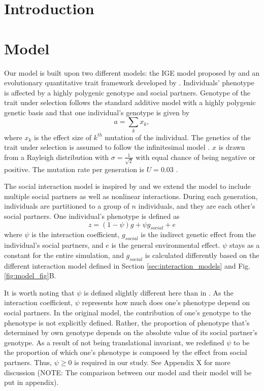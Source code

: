 \documentclass{article}
\begin{document}
\section{Introduction}



\section{Model}
Our model is built upon two different models: the IGE model proposed by \cite{Moore1997} and an evolutionary quantitative trait framework developed by \cite{Hayward2022}. Individuals' phenotype is affected by a highly polygenic genotype and social partners. Genotype of the trait under selection follows the standard additive model with a highly polygenic genetic basis \cite{Hayward2022, Falconer1996} and that one individual's genotype is given by 
\begin{equation}
a = \sum_k x_{k},
\label{g_def}
\end{equation}
where $x_k$ is the effect size of $k^{th}$ mutation of the individual. The genetics of the trait under selection is assumed to follow the infinitesimal model \cite{Fisher1918}. $x$ is drawn from a Rayleigh distribution with $\sigma=\frac{1}{\sqrt{2}}$ with equal chance of being negative or positive. The mutation rate per generation is $U=0.03$ \cite{Hayward2022}.

The social interaction model is inspired by \cite{Moore1997} and we extend the model to include multiple social partners as well as nonlinear interactions. During each generation, individuals are partitioned to a group of $n$ individuals, and they are each other's social partners. One individual's phenotype is defined as 
\begin{equation}
\label{eq:z_def}
z = (1-\psi)g+\psi g_{social} +e
\end{equation}
where $\psi$ is the interaction coefficient, $g_{social}$ is the indirect genetic effect from the individual's social partners, and $e$ is the general environmental effect. $\psi$ stays as a constant for the entire simulation, and $g_{social}$ is calculated differently based on the different interaction model defined in Section \ref{sec:interaction_models} and Fig. \ref{fig:model_fig}B. 

It is worth noting that $\psi$ is defined slightly different here than in \cite{Moore1997}. As the interaction coefficient, $\psi$ represents how much does one's phenotype depend on social partners. In the original model, the contribution of one's genotype to the phenotype is not explicitly defined. Rather, the proportion of phenotype that's determined by own genotype depends on the absolute value of its social partner's genotype. As a result of not being translational invariant, we redefined $\psi$ to be the proportion of which one's phenotype is composed by the effect from social partners. Thus, $\psi\geq0$ is required in our study. See Appendix X for more discussion (NOTE: The comparison between our model and their model will be put in appendix).
\end{document}
